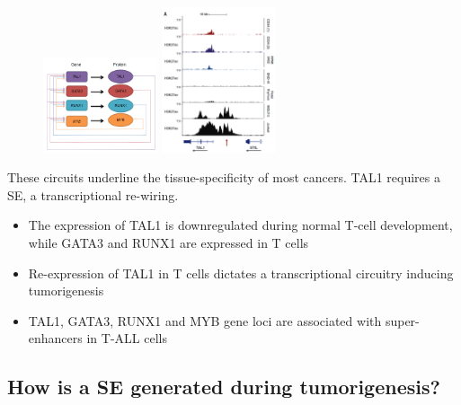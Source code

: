 \begin{figure}[!htb]
   \begin{minipage}{0.48\textwidth}
     \centering
     \includegraphics[width=0.3\textwidth]{../_resources/99fbd93b812d482263d53c442698a36a.png}
\caption{}
\label{fig:hema}
   \end{minipage}\hfill
   \begin{minipage}{0.48\textwidth}
     \centering
     \includegraphics[width=0.3\textwidth]{../_resources/c099d4a9ad4bba13e7839f48fd831265.png}
\caption{}
\label{fig:talju}
   \end{minipage}
\end{figure}

These circuits underline the tissue-specificity of most cancers. TAL1 requires a SE, a transcriptional re-wiring.
\begin{itemize}
\item The expression of TAL1 is downregulated during normal T-cell development, while GATA3 and RUNX1 are expressed in T cells
\item  Re-expression of TAL1 in T cells dictates a transcriptional circuitry inducing tumorigenesis
\item TAL1, GATA3, RUNX1 and MYB gene loci are associated with super-enhancers in T-ALL cells
\end{itemize}

\hypertarget{how-is-a-se-generated-during-tumorigenesis}{%
\subsection{How is a SE generated during tumorigenesis?}\label{how-is-a-se-generated-during-tumorigenesis}}

